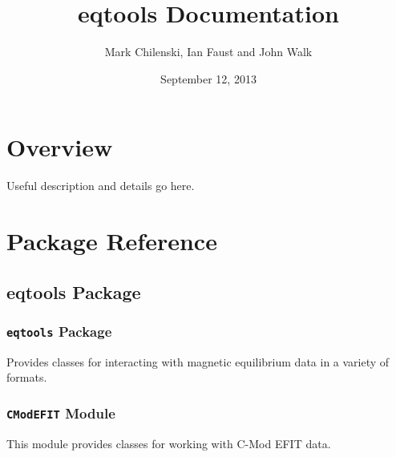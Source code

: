 \documentclass[letterpaper,10pt,english]{sphinxmanual}
\title{eqtools Documentation}
\date{September 12, 2013}
\author{Mark Chilenski, Ian Faust and John Walk}
\begin{document}
\maketitle
\tableofcontents
{}\label{index::doc}



\chapter{Overview}
\label{index:overview}\label{index:eqtools-tools-for-interacting-with-magnetic-equilibria}
Useful description and details go here.


\chapter{Package Reference}
\label{index:package-reference}

\section{eqtools Package}
\label{eqtools::doc}\label{eqtools:eqtools-package}

\subsection{\texttt{eqtools} Package}
\label{eqtools:id1}\label{eqtools:module-eqtools.__init__}
Provides classes for interacting with magnetic equilibrium data in a variety of formats.


\subsection{\texttt{CModEFIT} Module}
\label{eqtools:module-eqtools.CModEFIT}\label{eqtools:cmodefit-module}
This module provides classes for working with C-Mod EFIT data.
\end{document}
